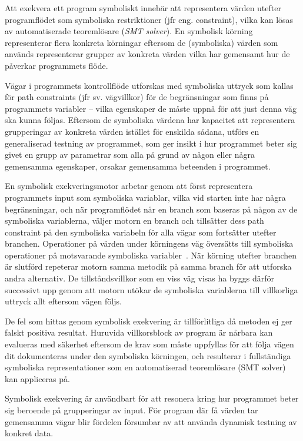 Att exekvera ett program symboliskt innebär att representera värden utefter
programflödet som symboliska restriktioner (jfr eng. constraint), vilka kan
lösas av automatiserade teoremlösare (\emph{SMT solver}). En symbolisk körning
representerar flera konkreta körningar eftersom de (symboliska) värden som
används representerar grupper av konkreta värden vilka har gemensamt hur de
påverkar programmets flöde. 

Vägar i programmets kontrollflöde utforskas med symboliska uttryck som kallas
för path constraints (jfr sv. vägvillkor) för de begränsningar som finns på
programmets variabler -- vilka egenskaper de måste uppnå för att just denna väg
ska kunna följas. Eftersom de symboliska värdena har kapacitet att representera
grupperingar av konkreta värden istället för enskilda sådana, utförs en
generaliserad testning av programmet, som ger insikt i hur programmet beter sig
givet en grupp av parametrar som alla på grund av någon eller några gemensamma
egenskaper, orsakar gemensamma beteenden i programmet. 

En symbolisk exekveringsmotor arbetar genom att först representera programmets
input som symboliska variablar, vilka vid starten inte har några begränsningar,
och när programflödet når en branch som baseras på någon av de symboliska
variablerna, väljer motorn en branch och tillsätter dess path constraint på den
symboliska variabeln för alla vägar som fortsätter utefter branchen. Operationer
på värden under körningens väg översätts till symboliska operationer på
motsvarande symboliska variabler~\cite{klee}. När körning utefter branchen är
slutförd repeterar motorn samma metodik på samma branch för att utforska andra
alternativ. De tillståndsvillkor som en viss väg visas ha byggs därför
successivt upp genom att motorn utökar de symboliska variablerna till
villkorliga uttryck allt eftersom vägen följs. 

De fel som hittas genom symbolisk exekvering är tillförlitliga då metoden ej ger
falskt positiva resultat. Huruvida villkorsblock av program är nårbara kan
evalueras med säkerhet eftersom de krav som måste uppfyllas för att följa vägen
dit dokumenteras under den symboliska körningen, och resulterar i fullständiga
symboliska representationer som en automatiserad teoremlösare (SMT solver) kan
appliceras på. 

Symbolisk exekvering är användbart för att resonera kring hur programmet beter
sig beroende på grupperingar av input. För program där få värden tar gemensamma
vägar blir fördelen försumbar av att använda dynamisk testning av konkret data. 

